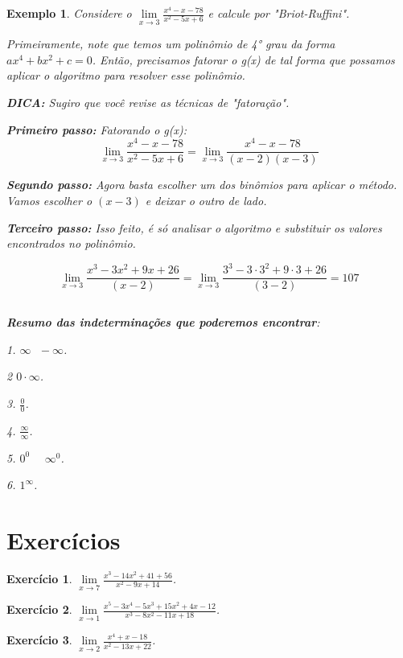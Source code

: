 \documentclass{book}
\numberwithin{defn}{chapter}
\newtheorem{exe}{Exemplo}
\numberwithin{exe}{chapter}
\newtheorem{ex}{Exercício}
\numberwithin{ex}{chapter}
\numberwithin{obs}{chapter}
\numberwithin{fato}{chapter}
\numberwithin{resp}{chapter}
\begin{document}
\begin{exe} Considere o $\lim\limits_{x\to 3}\frac{x^4-x-78}{x^2-5x+6}$ e calcule por "Briot-Ruffini".

Primeiramente, note que temos um polinômio de 4° grau da forma $ax^4+bx^2+c=0$. Então, precisamos fatorar o g(x) de tal forma que possamos aplicar o algoritmo para resolver esse polinômio.

\item\textbf{DICA:} Sugiro que você revise as técnicas de "fatoração". 

\item\textbf{Primeiro passo:} Fatorando o g(x):
\[\lim\limits_{x\to 3}\frac{x^4-x-78}{x^2-5x+6} = \lim\limits_{x\to 3}\frac{x^4-x-78}{(x-2)(x-3)}\]

\item\textbf{Segundo passo:} Agora basta escolher um dos binômios para aplicar o método. Vamos escolher o $(x-3)$ e deixar o outro de lado.

\begin{center}
\end{center}

\item\textbf{Terceiro passo:} Isso feito, é só analisar o algoritmo e substituir os valores encontrados no polinômio.

    \[\lim\limits_{x\to 3}\frac{x^3-3x^2+9x+26}{(x-2)} = \lim\limits_{x\to 3}\frac{3^3-3\cdot 3^2+9\cdot 3+26}{(3-2)} = 107\]

\[\]
\item\textbf{Resumo das indeterminações que poderemos encontrar}:
\item 1. $\infty \text{ } -\infty$.
\item 2 $0\cdot \infty$.
\item 3. $\frac{0}{0}$.
\item 4. $\frac{\infty}{\infty}$.
\item 5. $0^0 \text{ }\text{ }\infty^0$.
\item 6. $1^\infty$.
\end{exe}


\section{Exercícios}
\begin{ex}
    $\lim\limits_{x\to 7}\frac{x^3-14x^2+41+56}{x^2-9x+14}$.   
\end{ex}
\begin{ex}
    $\lim\limits_{x\to 1}\frac{x^5-3x^4-5x^3+15x^2+4x-12}{x^3-8x^2-11x+18}$.   
\end{ex}
\begin{ex}
    $\lim\limits_{x\to 2}\frac{x^4+x-18}{x^2-13x+22}$.   
\end{ex}
\end{document}

